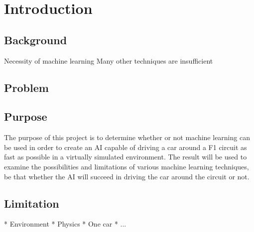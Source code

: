 \chapter{Introduction}

\section{Background}
Necessity of machine learning
Many other techniques are insufficient

\section{Problem}


\section{Purpose}
The purpose of this project is to determine whether or not machine learning can be used in order to create an AI capable of driving a car around a F1 circuit as fast as possible in a virtually simulated environment. The result will be used to examine the possibilities and limitations of various machine learning techniques, be that whether the AI will succeed in driving the car around the circuit or not. 


\section{Limitation}
* Environment
* Physics
* One car 
* ...